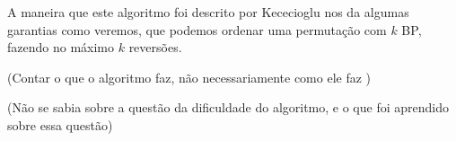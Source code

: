 A maneira que este algoritmo foi descrito por Kececioglu nos da algumas garantias como veremos, que podemos ordenar uma permutação com $k$ BP, fazendo no máximo $k$ reversões.

(Contar o que o algoritmo faz, não necessariamente como ele faz )

(Não se sabia sobre a questão da dificuldade do algoritmo, e o que foi aprendido sobre essa questão)